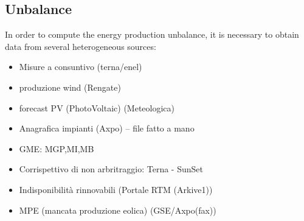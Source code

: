 
\subsection{Unbalance}
    In order to compute the energy production unbalance, it is necessary to obtain data from several heterogeneous sources:
        
    \begin{itemize}
        \item Misure a consuntivo (terna/enel)    
        \item produzione wind (Rengate)
        \item forecast PV (PhotoVoltaic) (Meteologica)
        \item Anagrafica impianti (Axpo) -- file fatto a mano
        \item GME: MGP,MI,MB
        \item Corrispettivo di non arbritraggio: Terna - SunSet
        \item Indisponibilità rinnovabili (Portale RTM (Arkive1))
        \item MPE (mancata produzione eolica) (GSE/Axpo(fax))
    \end{itemize}

